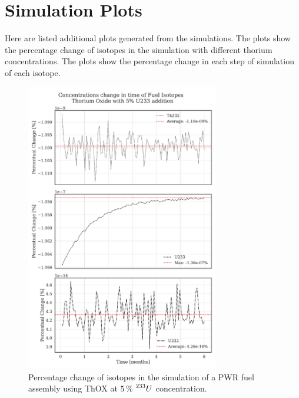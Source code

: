 \appendix

\chapter{Simulation Plots}

Here are listed additional plots generated from the simulations. The plots show the percentage change of isotopes in the simulation with different thorium concentrations. The plots show the percentage change in each step of simulation of each isotope. 

\begin{figure}[h]
    \centering
    \includegraphics[width=0.75\textwidth, height=0.75\textheight]{Kap7/Figures_Kap7/percentual_change_th232_U233_5.pdf}
    \caption{Percentage change of isotopes in the simulation of a PWR fuel assembly using ThOX at \(5 \, \%\) \(\prescript{233}{}{U}\) concentration.}
    \label{fig:th_u233_5}
\end{figure}


